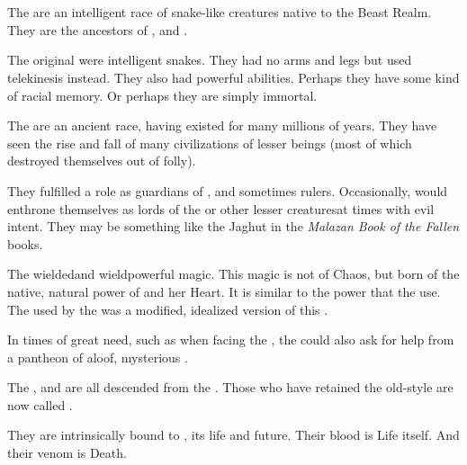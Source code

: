 \section{\Ophidians}
\index{\ophidian}
The \ophidians{} are an intelligent race of snake-like creatures native to the Beast Realm. 
They are the ancestors of \dragons, \quiljaaran{} and \nagae. 



The original \ophidians{} were intelligent snakes. They had no arms and legs but used telekinesis instead. They also had powerful  abilities. Perhaps they have some kind of racial memory. Or perhaps they are simply immortal. 

The \ophidians{} are an ancient race, having existed for many millions of years. 
They have seen the rise and fall of many civilizations of lesser beings (most of which destroyed themselves out of folly). 

They fulfilled a role as guardians of \Miith{}, and sometimes rulers. Occasionally, \ophidians{} would enthrone themselves as lords of the \nephilim{} or other lesser creatures\dash at times with evil intent. They may be something like the Jaghut in the \emph{Malazan Book of the Fallen} books. 

The \ophidians{} wielded\dash and wield\dash powerful magic. 
This magic is not of Chaos, but born of the native, natural power of \Miith{} and her Heart. 
It is similar to the \Wylde{} power that the  use. 
The  used by the  was a modified, idealized version of this \dweomer{}.

In times of great need, such as when facing the \xzaishann, the \ophidians{} could also ask for help from a pantheon of aloof, mysterious . 

The \dragons, \quiljaaran{} and \nagae{} are all descended from the \ophidians.
Those who have retained the old-style \ophidian{} are now called \quo{\trueophidians}. 


They are intrinsically bound to \Miith{}, its life and future. Their blood is Life itself. And their venom is Death. 

